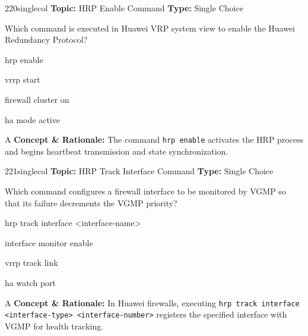 \begin{qcard}{220}{singlecol}
\textcolor{darkslate!75}{\small\textbf{Topic:} HRP Enable Command \hfill \textbf{Type:} Single Choice}\vspace{0.4em}\par
Which command is executed in Huawei VRP system view to enable the Huawei Redundancy Protocol?
\begin{qoptions}
\item hrp enable
\item vrrp start
\item firewall cluster on
\item ha mode active
\end{qoptions}
\end{qcard}
\nopagebreak
\begin{explainbox}{A}
\textbf{Concept \& Rationale:} The command \texttt{hrp enable} activates the HRP process and begins heartbeat transmission and state synchronization.
\end{explainbox}

\begin{qcard}{221}{singlecol}
\textcolor{darkslate!75}{\small\textbf{Topic:} HRP Track Interface Command \hfill \textbf{Type:} Single Choice}\vspace{0.4em}\par
Which command configures a firewall interface to be monitored by VGMP so that its failure decrements the VGMP priority?
\begin{qoptions}
\item hrp track interface \textless{}interface-name\textgreater{}
\item interface monitor enable
\item vrrp track link
\item ha watch port
\end{qoptions}
\end{qcard}
\nopagebreak
\begin{explainbox}{A}
\textbf{Concept \& Rationale:} In Huawei firewalls, executing \texttt{hrp track interface \textless{}interface-type\textgreater{} \textless{}interface-number\textgreater{}} registers the specified interface with VGMP for health tracking.
\end{explainbox}


